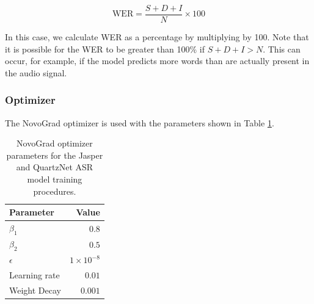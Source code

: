 \documentclass[12pt]{article}
\begin{document}
\begin{equation}\label{eq:word_error_rate}
    \mbox{WER} = \frac{S + D + I}{N} \times 100
\end{equation}

\noindent
In this case, we calculate WER as a percentage by multiplying by 100. Note that it is possible for the WER to be greater than 100\% if
$S + D + I > N$. This can occur, for example, if the model predicts more words than are actually present in the audio signal.

\subsubsection{Optimizer}\label{sec:asr_optimizer}
The NovoGrad optimizer \cite{ginsburg_stochastic_2019} is used with the parameters shown in Table \ref{tab:novograd_params}.

\begin{table}[!t]
    \centering
    \begin{tabular}{l r}
        \toprule
        Parameter     & Value              \\
        \midrule
        $\beta_1$     & $0.8$              \\
        $\beta_2$     & $0.5$              \\
        $\epsilon$    & $1 \times 10^{-8}$ \\
        Learning rate & $0.01$             \\
        Weight Decay  & $0.001$            \\
        \bottomrule
    \end{tabular}
    \caption{NovoGrad optimizer parameters for the Jasper and QuartzNet ASR model training procedures.}
    \label{tab:novograd_params}
\end{table}
\end{document}
